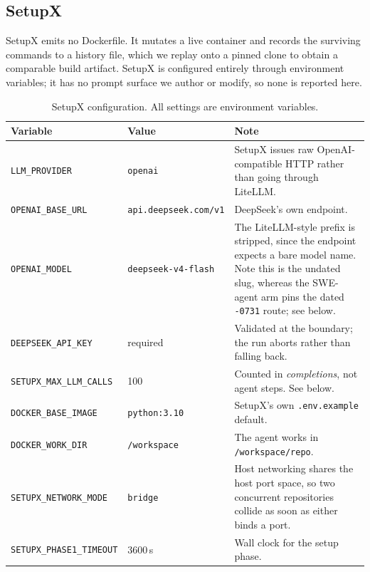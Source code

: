 \subsection{SetupX}
\label{app:baseline-setupx}

SetupX emits no Dockerfile. It mutates a live container and records the
surviving commands to a history file, which we replay onto a pinned clone to
obtain a comparable build artifact. SetupX is configured entirely through
environment variables; it has no prompt surface we author or modify, so none is
reported here.

\begin{table}[h]
\centering\footnotesize
\caption{SetupX configuration. All settings are environment variables.}
\label{tab:setupx-config}
\begin{tabularx}{\linewidth}{@{}Y{0.95}Y{0.70}Y{1.35}@{}}
\toprule
\textbf{Variable} & \textbf{Value} & \textbf{Note} \\
\midrule
\texttt{LLM\_PROVIDER} & \texttt{openai} &
  SetupX issues raw OpenAI-compatible HTTP rather than going through
  LiteLLM. \\
\texttt{OPENAI\_BASE\_URL} & \texttt{api.deepseek.\allowbreak com/v1} &
  DeepSeek's own endpoint. \\
\texttt{OPENAI\_MODEL} & \texttt{deepseek-v4-flash} &
  The LiteLLM-style prefix is stripped, since the endpoint expects a bare model
  name. Note this is the undated slug, whereas the SWE-agent arm pins the dated
  \texttt{-0731} route; see below. \\
\texttt{DEEPSEEK\_API\_KEY} & required &
  Validated at the boundary; the run aborts rather than falling back. \\
\texttt{SETUPX\_MAX\_LLM\_\allowbreak CALLS} & 100 &
  Counted in \emph{completions}, not agent steps. See below. \\
\texttt{DOCKER\_BASE\_IMAGE} & \texttt{python:3.10} &
  SetupX's own \texttt{.env.example} default. \\
\texttt{DOCKER\_WORK\_DIR} & \texttt{/workspace} &
  The agent works in \texttt{/workspace/repo}. \\
\texttt{SETUPX\_NETWORK\_MODE} & \texttt{bridge} &
  Host networking shares the host port space, so two concurrent repositories
  collide as soon as either binds a port. \\
\texttt{SETUPX\_PHASE1\_\allowbreak TIMEOUT} & 3600\,s &
  Wall clock for the setup phase. \\

\end{tabularx}
\end{table}
